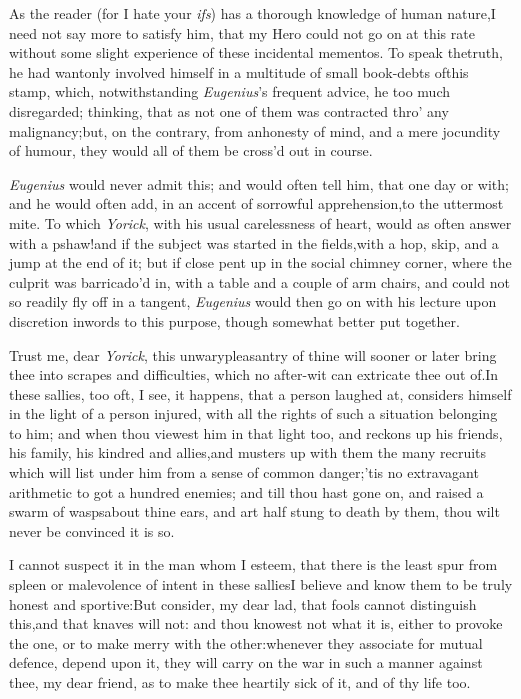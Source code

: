\documentclass{article}
\begin{document}
As the reader (for I hate your \textit{ifs}) has a thorough
knowledge of human nature,\break I need not say more to satisfy him, that my
Hero could not go on at this rate without some
slight experience of these incidental mementos. To speak the\break truth,
he had wantonly involved himself in a multitude of small book-debts
of\break this stamp, which, notwithstanding \textit{Eu\-genius}’s
frequent advice, he too much disregarded; thinking, that as not one
of them was contracted thro’ any malignancy;\tsk  but, on
the contrary, from an\pb honesty of mind, and a mere jocundity of
humour, they would all of them be cross’d out in course.

\textit{Eugenius} would never admit this; and would often tell
him, that one day or 
with; and he would often add, in an accent of sorrowful apprehension,\tsk  to the
uttermost mite. To which \textit{Yorick}, with his usual carelessness of heart,
would as often answer with a pshaw!\tsk  and if the subject was started in the
fields,\tsk  with a hop, skip, and a jump at the end of it; but if close pent up in
the social chimney corner, where the culprit was barri\-ca\-do’d in, with a table
and a couple of arm chairs, and could not so readily fly off in a tangent,\tsk
\textit{Eugenius} would then go on with his lecture upon discretion in\pb words to
this purpose, though somewhat better put together.

Trust me, dear \textit{Yorick}, this unwary\break pleasantry of thine
will sooner or later bring thee into scrapes and difficulties,
which no after-wit can extricate thee out of.\tsh  In these
sallies, too oft, I see, it happens, that a person laughed at,
considers himself in the light of a person injured, with all the
rights of such a situation belonging to him; and when thou viewest
him in that light too, and rec\-kons up his friends, his family, his
kindred and allies,\tsk  and musters up with them the many
recruits which will list under him from a sense of common
danger;\tsk  ’tis no extravagant arithmetic to
got a hundred enemies; and till
thou hast gone on, and raised a swarm of wasps\pb about thine ears,
and art half stung to death by them, thou wilt never be
convinced it is so.

I cannot suspect it in the man whom I esteem, that there is the
least spur from spleen or malevolence of intent in these
sallies\tsk  I believe and know them to be truly honest and
sportive:\tsk  But consider, my dear lad, that fools cannot
distinguish this,\tsk  and that knaves will not: and thou knowest
not what it is, either to provoke the one, or to make merry with
the other:\tsh  whenever they associate for mutual defence,
depend upon it, they will carry on the war in such a manner against
thee, my dear friend, as to make thee heartily sick of it, and of
thy life too.
\end{document}
